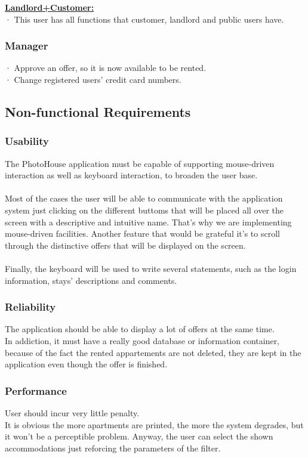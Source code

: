 \documentclass[12pt]{article}
\begin{document}
{\textbf{\underline{Landlord+Customer:}}\\
· This user has all functions that customer, landlord and public users have.

\subsubsection{Manager}
· Approve an offer, so it is now available to be rented.\\
· Change registered users' credit card numbers.

\subsection{Non-functional Requirements}
\subsubsection{Usability}
The PhotoHouse application must be capable of supporting mouse-driven interaction as well as keyboard interaction, to broaden the user base.\\\\
Most of the cases the user will be able to communicate with the application system just clicking on the different buttoms that will be placed all over the screen with a descriptive and intuitive name. That's why we are implementing mouse-driven facilities. Another feature that would be grateful it's to scroll through the distinctive offers that will be displayed on the screen.\\\\
Finally, the keyboard will be used to write several statements, such as the login information, stays' descriptions and comments. 
\subsubsection{Reliability}
The application should be able to display a lot of offers at the same time.\\ In addiction, it must have a really good database or information container, because of the fact the rented appartements are not deleted, they are kept in the application even though the offer is finished.
\subsubsection{Performance}
User should incur very little penalty.\\ It is obvious the more apartments are printed, the more the system degrades, but it won't be a perceptible problem. Anyway, the user can select the shown accommodations just reforcing the parameters of the filter.
}
\end{document}

